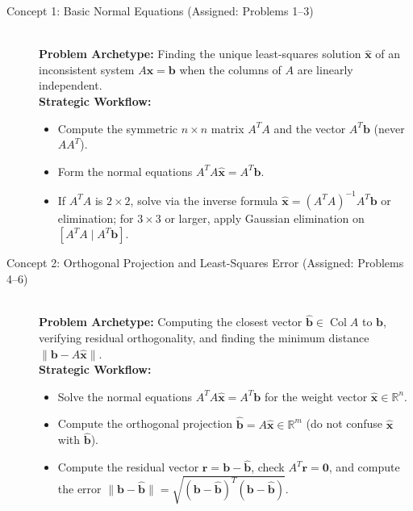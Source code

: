 \documentclass[11pt, letterpaper]{article}
\theoremstyle{definition}
\theoremstyle{remark}
\begin{document}
\begin{description}
    \item[Concept 1: Basic Normal Equations (Assigned: Problems 1--3)] \hfill \\
    \textbf{Problem Archetype:} Finding the unique least-squares solution $\hat{\mathbf{x}}$ of an inconsistent system $A\mathbf{x} = \mathbf{b}$ when the columns of $A$ are linearly independent.\\
    \textbf{Strategic Workflow:}
    \begin{itemize}
        \item Compute the symmetric $n \times n$ matrix $A^T A$ and the vector $A^T \mathbf{b}$ (never $AA^T$).
        \item Form the normal equations $A^T A \hat{\mathbf{x}} = A^T \mathbf{b}$.
        \item If $A^T A$ is $2 \times 2$, solve via the inverse formula $\hat{\mathbf{x}} = (A^T A)^{-1} A^T \mathbf{b}$ or elimination; for $3 \times 3$ or larger, apply Gaussian elimination on $[A^T A \mid A^T \mathbf{b}]$.
    \end{itemize}

    \item[Concept 2: Orthogonal Projection and Least-Squares Error (Assigned: Problems 4--6)] \hfill \\
    \textbf{Problem Archetype:} Computing the closest vector $\hat{\mathbf{b}} \in \operatorname{Col} A$ to $\mathbf{b}$, verifying residual orthogonality, and finding the minimum distance $\|\mathbf{b} - A\hat{\mathbf{x}}\|$.\\
    \textbf{Strategic Workflow:}
    \begin{itemize}
        \item Solve the normal equations $A^T A \hat{\mathbf{x}} = A^T \mathbf{b}$ for the weight vector $\hat{\mathbf{x}} \in \mathbb{R}^n$.
        \item Compute the orthogonal projection $\hat{\mathbf{b}} = A\hat{\mathbf{x}} \in \mathbb{R}^m$ (do not confuse $\hat{\mathbf{x}}$ with $\hat{\mathbf{b}}$).
        \item Compute the residual vector $\mathbf{r} = \mathbf{b} - \hat{\mathbf{b}}$, check $A^T \mathbf{r} = \mathbf{0}$, and compute the error $\|\mathbf{b} - \hat{\mathbf{b}}\| = \sqrt{(\mathbf{b} - \hat{\mathbf{b}})^T(\mathbf{b} - \hat{\mathbf{b}})}$.
    \end{itemize}


\end{description}
\end{document}
